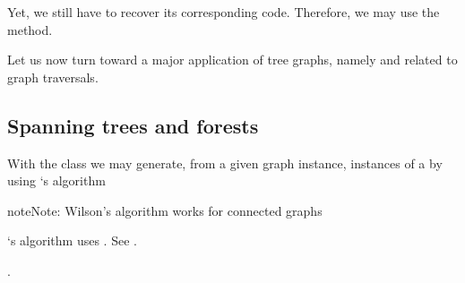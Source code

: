 \documentclass[a4paper,10pt,english]{sphinxhowto}
\begin{document}
Yet, we still have to recover its corresponding  code. Therefore, we may use the  method.

\begin{sphinxVerbatim}[commandchars=\\\{\}]
   
\end{sphinxVerbatim}

Let us now turn toward a major application of tree graphs, namely  and  related to graph traversals.


\subsection{Spanning trees and forests}
\label{\detokenize{tutorial:spanning-trees-and-forests}}
With the  class we may generate, from a given  graph  instance,  instances of a  by using  ‘s algorithm 

\begin{sphinxadmonition}{note}{Note:}
Wilson’s algorithm  works for connected graphs %
\begin{footnote}[4]\sphinxAtStartFootnote
{} ‘s algorithm uses . See  .
%
\end{footnote}.
\end{sphinxadmonition}
\end{document}
